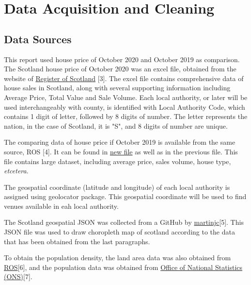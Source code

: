 \documentclass{homeworg}
\begin{document}
\section{Data Acquisition and Cleaning}
\subsection{Data Sources}
This report used house price of October 2020 and October 2019 as comparison. The Scotland house price of October 2020 was an excel file, obtained from the website of \href{https://www.ros.gov.uk/__data/assets/excel_doc/0010/173575/RoS_monthly-house-price-statistics_tables_Oct-2020.xlsx}{Register of Scotland} [3]. The excel file contains comprehensive data of house sales in Scotland, along with several supporting information including Average Price, Total Value and Sale Volume. Each local authority, or later will be used interchangeably with county, is identified with Local Authority Code, which contains 1 digit of letter, followed by 8 digits of number. The letter represents the nation, in the case of Scotland, it is "S", and 8 digits of number are unique. \par
The comparing data of house price if October 2019 is available from the same source, ROS [4]. It can be found in \href{https://www.ros.gov.uk/__data/assets/excel_doc/0007/171385/RoS_quarterly-house-price-statistics_tables_2020-21-Q2_July-to-September-2020.xlsx}{new file} as well as in the previous file. This file contains large dataset, including average price, sales volume, house type, \textit{etcetera}. \par
The geospatial coordinate (latitude and longitude) of each local authority is assigned using geolocator package. This geospatial coordinate will be used to find venues available in eah local authority. \par
The Scotland geospatial JSON was collected from a GitHub by \href{https://github.com/martinjc/UK-GeoJSON/raw/master/json/administrative/sco/lad.json}{martinjc}[5]. This JSON file was used to draw choropleth map of scotland according to the data that has been obtained from the last paragraphs. \par
To obtain the population density, the land area data was also obtained from \href{https://www.ros.gov.uk/__data/assets/excel_doc/0016/162016/property-market-report-2019-2020.xlsx}{ROS}[6], and the population data was obtained from \href{https://www.ons.gov.uk/file?uri=\%2fpeoplepopulationandcommunity\%2fpopulationandmigration\%2fpopulationestimates\%2fdatasets\%2fpopulationestimatesforukenglandandwalesscotlandandnorthernireland\%2fmid2019april2020localauthoritydistrictcodes/ukmidyearestimates20192020ladcodes.xls}{Office of National Statistics (ONS)}[7].
\end{document}
